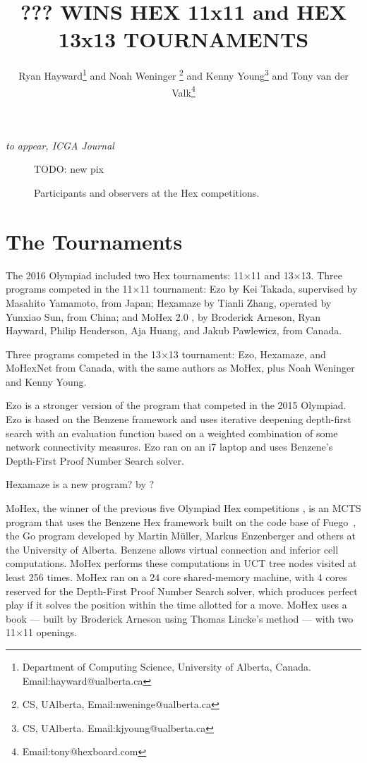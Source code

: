\documentclass{icga}
\title{\sc ??? WINS HEX 11x11 and HEX 13x13 TOURNAMENTS}
\author{Ryan Hayward\thanks{Department 
of Computing Science, University of Alberta, Canada. Email:hayward@ualberta.ca} and
Noah Weninger \thanks{CS, UAlberta, Email:nweninge@ualberta.ca} and
Kenny Young\thanks{CS, UAlberta. Email:kjyoung@ualberta.ca} and
Tony van der Valk\thanks{Email:tony@hexboard.com}
}
\affiliation{Edmonton, Canada}
\newif\iflong\longfalse  %
\def\Eo{\mbox{\sc Ezo}}
\def\Hz{\mbox{\sc Hexamaze}}
\def\Mx{\mbox{\sc MoHex}}
\def\Mt{\mbox{\sc MoHexNet}}
\def\Fuego{\mbox{\sc Fuego}}
\begin{document}
\maketitle

\iflong
In the longer version of the report, we include all games.
\fi

\vspace*{-2.25in}
{\it to appear, ICGA Journal}
\vspace*{2.0in}

\begin{figure}[hbt]
TODO: new pix

\caption{Participants and observers at the Hex competitions.}
\end{figure}


\section{The Tournaments}
The 2016 Olympiad included
two Hex tournaments: 11$\times$11 and 13$\times$13.
Three programs competed in the 11$\times$11 tournament:
\Eo{} by Kei Takada, supervised by Masahito Yamamoto, from Japan;
\Hz{} by Tianli Zhang, operated by Yunxiao Sun, from China; and
\Mx{} 2.0 , 
by Broderick Arneson, Ryan Hayward, Philip Henderson, Aja Huang, and Jakub Pawlewicz, from Canada.

Three programs competed in the 13$\times$13 tournament:
\Eo{}, \Hz{}, and \Mt{} from Canada,
with the same authors as \Mx{}, plus Noah Weninger and Kenny Young.

\Eo{} is a stronger version of the program that competed in the 2015 Olympiad.
\Eo{} is based on the Benzene framework and uses iterative deepening depth-first search with an evaluation function based on a weighted combination of some network connectivity measures.
\Eo{} ran on an i7 laptop and uses Benzene's 
Depth-First Proof Number Search solver.

\Hz{} is a new program?  by ?  

\Mx{}, the winner of the previous five Olympiad Hex competitions
,
is an MCTS program that uses the Benzene Hex framework
built on the code base of \Fuego\ ,
the Go program developed by Martin M\"{u}ller, Markus Enzenberger
and others at the University of Alberta.
Benzene allows virtual connection and
inferior cell computations.
\Mx{} performs these computations in UCT tree nodes visited at least 256 times.
\Mx{} ran on a 24 core shared-memory machine, 
with 4 cores reserved for the 
Depth-First Proof Number Search solver, which
produces perfect play if it solves the
position within the time allotted for a move.
\Mx{} uses a book ---
built by Broderick Arneson using Thomas Lincke's method 
 ---
with two 11$\times$11 openings.
\end{document}
